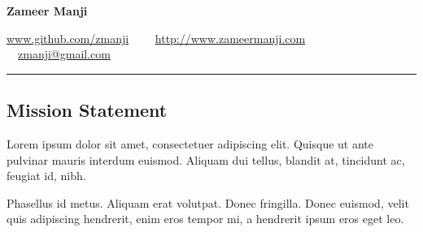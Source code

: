 \documentclass[10pt,letterpaper]{article}
\begin{document}
\begin{center}
{\Large \textbf{Zameer Manji}}


\href{http://www.github.com/zmanji/}{www.github.com/zmanji}\ \ \textbullet
\ \ \href{http://www.zameermanji.com}{http://www.zameermanji.com}\ \ \textbullet
\ \ \href{malto:zmanji@gmail.com}{zmanji@gmail.com}

\end{center}

\hrule
\vspace{-0.4em}
\subsection*{Mission Statement}

Lorem ipsum dolor sit amet, consectetuer adipiscing elit. Quisque ut ante
pulvinar mauris interdum euismod. Aliquam dui tellus, blandit at, tincidunt ac,
feugiat id, nibh.

Phasellus id metus. Aliquam erat volutpat. Donec fringilla. Donec euismod, velit
quis adipiscing hendrerit, enim eros tempor mi, a hendrerit ipsum eros eget leo.

\textcopyright
\end{document}
